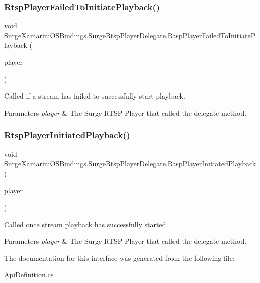 \subsubsection{\texorpdfstring{Rtsp\+Player\+Failed\+To\+Initiate\+Playback()}{RtspPlayerFailedToInitiatePlayback()}}
{\footnotesize\ttfamily void Surge\+Xamarini\+O\+S\+Bindings.\+Surge\+Rtsp\+Player\+Delegate.\+Rtsp\+Player\+Failed\+To\+Initiate\+Playback (\begin{DoxyParamCaption}\item[{\hyperlink{interface_surge_xamarini_o_s_bindings_1_1_surge_rtsp_player}{Surge\+Rtsp\+Player}}]{player }\end{DoxyParamCaption})}



Called if a stream has failed to successfully start playback. 


\begin{DoxyParams}{Parameters}
{\em player} & The Surge R\+T\+SP Player that called the delegate method.\\
\hline
\end{DoxyParams}
\mbox{\label{interface_surge_xamarini_o_s_bindings_1_1_surge_rtsp_player_delegate_a086947a6da6d523853a8cfacd4be654a}} 
\subsubsection{\texorpdfstring{Rtsp\+Player\+Initiated\+Playback()}{RtspPlayerInitiatedPlayback()}}
{\footnotesize\ttfamily void Surge\+Xamarini\+O\+S\+Bindings.\+Surge\+Rtsp\+Player\+Delegate.\+Rtsp\+Player\+Initiated\+Playback (\begin{DoxyParamCaption}\item[{\hyperlink{interface_surge_xamarini_o_s_bindings_1_1_surge_rtsp_player}{Surge\+Rtsp\+Player}}]{player }\end{DoxyParamCaption})}



Called once stream playback has successfully started. 


\begin{DoxyParams}{Parameters}
{\em player} & The Surge R\+T\+SP Player that called the delegate method.\\
\hline
\end{DoxyParams}


The documentation for this interface was generated from the following file\+:\begin{DoxyCompactItemize}
\item 
\hyperlink{_api_definition_8cs}{Api\+Definition.\+cs}\end{DoxyCompactItemize}
